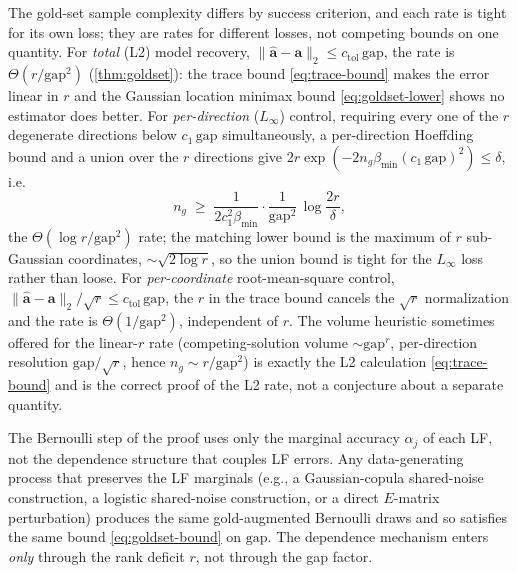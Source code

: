 \begin{remark}
\label{rmk:r-dependence}
The gold-set sample complexity differs by success criterion, and each
rate is tight for its own loss; they are rates for different losses, not
competing bounds on one quantity. For \emph{total} (L2) model recovery,
$\|\hat{\bm{a}} - \bm{a}\|_2 \le c_{\mathrm{tol}}\,\mathrm{gap}$, the rate is
$\Theta(r/\mathrm{gap}^2)$ (\cref{thm:goldset}): the trace bound
\eqref{eq:trace-bound} makes the error linear in $r$ and the Gaussian
location minimax bound \eqref{eq:goldset-lower} shows no estimator does
better. For \emph{per-direction} ($L_\infty$) control, requiring every
one of the $r$ degenerate directions below $c_1\,\mathrm{gap}$
simultaneously, a per-direction Hoeffding bound and a union over the $r$
directions give $2r\exp(-2 n_g \beta_{\min}(c_1\,\mathrm{gap})^2) \le
\delta$, i.e.\
\begin{equation}
  n_g \;\ge\; \frac{1}{2 c_1^2 \beta_{\min}}
        \cdot \frac{1}{\mathrm{gap}^2}\,\log\!\frac{2r}{\delta},
  \label{eq:goldset-linf}
\end{equation}
the $\Theta(\log r/\mathrm{gap}^2)$ rate; the matching lower bound is
the maximum of $r$ sub-Gaussian coordinates, $\sim \sqrt{2\log r}$, so
the union bound is tight for the $L_\infty$ loss rather than loose. For
\emph{per-coordinate} root-mean-square control, $\|\hat{\bm{a}} -
\bm{a}\|_2/\sqrt{r} \le c_{\mathrm{tol}}\,\mathrm{gap}$, the $r$ in the trace bound
cancels the $\sqrt{r}$ normalization and the rate is
$\Theta(1/\mathrm{gap}^2)$, independent of $r$. The volume heuristic
sometimes offered for the linear-$r$ rate (competing-solution volume
$\sim \mathrm{gap}^r$, per-direction resolution
$\mathrm{gap}/\sqrt{r}$, hence $n_g \sim r/\mathrm{gap}^2$) is exactly
the L2 calculation \eqref{eq:trace-bound} and is the correct
proof of the L2 rate, not a conjecture about a separate quantity.
\end{remark}

\begin{remark}
\label{rmk:marginal-dgps}
The Bernoulli step of the proof uses only the marginal accuracy
$\alpha_j$ of each LF, not the dependence structure that couples LF
errors. Any data-generating process that preserves the LF marginals
(e.g., a Gaussian-copula shared-noise construction, a logistic
shared-noise construction, or a direct $E$-matrix perturbation)
produces the same gold-augmented Bernoulli draws and so satisfies the
same bound \eqref{eq:goldset-bound} on $\mathrm{gap}$. The
dependence mechanism enters \emph{only} through the rank deficit $r$,
not through the gap factor.
\end{remark}

